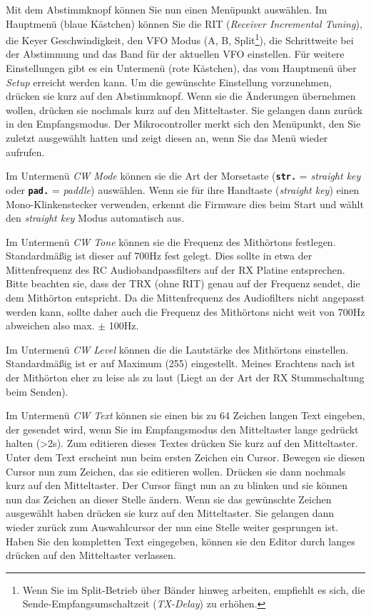\documentclass[10pt, a4paper]{paper}
\newcommand{\dis}[1]{\textbf{\texttt{#1}}}
\begin{document}
Mit dem Abstimmknopf können Sie nun einen Menüpunkt auswählen. Im Hauptmenü (blaue Kästchen) können Sie die RIT (\emph{Receiver Incremental Tuning}), die Keyer Geschwindigkeit, den VFO Modus (A, B, Split\footnote{Wenn Sie im Split-Betrieb über Bänder hinweg arbeiten, empfiehlt es sich, die Sende-Empfangsumschaltzeit (\emph{TX-Delay}) zu erhöhen.}), die Schrittweite bei der Abstimmung und das Band für der aktuellen VFO einstellen. Für weitere Einstellungen gibt es ein Untermenü (rote Kästchen), das vom Hauptmenü über \emph{Setup} erreicht werden kann. Um die gewünschte Einstellung vorzunehmen, drücken sie kurz auf den Abstimmknopf. Wenn sie die Änderungen übernehmen wollen, drücken sie nochmals kurz auf den Mitteltaster. Sie gelangen dann zurück in den Empfangsmodus. Der Mikrocontroller merkt sich den Menüpunkt, den Sie zuletzt ausgewählt hatten und zeigt diesen an, wenn Sie das Menü wieder aufrufen.

Im Untermenü \emph{CW Mode} können sie die Art der Morsetaste (\dis{str.} = \emph{straight key} oder \dis{pad.} = \emph{paddle}) auswählen. Wenn sie für ihre Handtaste (\emph{straight key}) einen Mono-Klinkenstecker verwenden, erkennt die Firmware dies beim Start und wählt den \emph{straight key} Modus automatisch aus.

Im Untermenü \emph{CW Tone} können sie die Frequenz des Mithörtons festlegen. Standardmäßig ist dieser auf 700Hz fest gelegt. Dies sollte in etwa der Mittenfrequenz des RC Audiobandpassfilters auf der RX Platine entsprechen. Bitte beachten sie, dass der TRX (ohne RIT) genau auf der Frequenz sendet, die dem Mithörton entspricht. Da die Mittenfrequenz des Audiofilters nicht angepasst werden kann, sollte daher auch die Frequenz des Mithörtons nicht weit von 700Hz abweichen also max. $\pm$ 100Hz.

Im Untermenü \emph{CW Level} können die die Lautstärke des Mithörtons einstellen. Standardmäßig ist er auf Maximum (255) eingestellt. Meines Erachtens nach ist der Mithörton eher zu leise als zu laut (Liegt an der Art der RX Stummschaltung beim Senden).

Im Untermenü \emph{CW Text} können sie einen bis zu 64 Zeichen langen Text eingeben, der gesendet wird, wenn Sie im Empfangsmodus den Mitteltaster lange gedrückt halten (>2s). Zum editieren dieses Textes drücken Sie kurz auf den Mitteltaster. Unter dem Text erscheint nun beim ersten Zeichen ein Cursor. Bewegen sie diesen Cursor nun zum Zeichen, das sie editieren wollen. Drücken sie dann nochmals kurz auf den Mitteltaster. Der Cursor fängt nun an zu blinken und sie können nun das Zeichen an dieser Stelle ändern. Wenn sie das gewünschte Zeichen ausgewählt haben drücken sie kurz auf den Mitteltaster. Sie gelangen dann wieder zurück zum Auswahlcursor der nun eine Stelle weiter gesprungen ist. Haben Sie den kompletten Text eingegeben, können sie den Editor durch langes drücken auf den Mitteltaster verlassen. 
\end{document}
